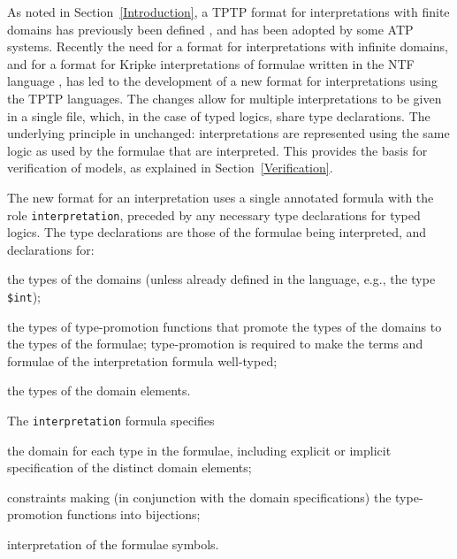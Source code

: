 \documentclass[letterpaper]{article}
\newcommand{\smalltt}[1]{\small \texttt{#1}}
\newenvironment{packed_itemize}{
\vspace*{-0.5em}
\begin{itemize}
\setlength{\partopsep}{0pt}
\setlength{\itemsep}{1pt}
\setlength{\parskip}{0pt}
\setlength{\parsep}{0pt}
}{\end{itemize}}
\begin{document}
As noted in Section~\ref{Introduction}, a TPTP format for interpretations with finite domains 
has previously been defined \cite{SS+06}, and has been adopted by some ATP systems.
Recently the need for a format for interpretations with infinite domains, and for a format for 
Kripke interpretations \cite{Kri63} of formulae written in the NTF language \cite{SF+22}, has 
led to the development of a new format for interpretations using the TPTP languages.
The changes allow for multiple interpretations to be given in a single file, which, in the case
of typed logics, share type declarations.
The underlying principle in unchanged: interpretations are represented using the same logic
as used by the formulae that are interpreted.
This provides the basis for verification of models, as explained in Section~\ref{Verification}.

The new format for an interpretation uses a single annotated formula with the role 
\smalltt{interpretation}, preceded by any necessary type declarations for typed logics.
The type declarations are those of the formulae being interpreted, and declarations for:
\begin{packed_itemize}
\item the types of the domains (unless already defined in the language, e.g., the type
      \smalltt{\$int});
\item the types of type-promotion functions that promote the types of the domains to the types 
      of the formulae; type-promotion is required to make the terms and formulae of the
      interpretation formula well-typed;
\item the types of the domain elements.
\end{packed_itemize}
\vspace*{-0.4em}
The \smalltt{interpretation} formula specifies 
\begin{packed_itemize}
\item the domain for each type in the formulae, including explicit or implicit specification
      of the distinct domain elements;
\item constraints making (in conjunction with the domain specifications) the type-promotion 
      functions into bijections;
\item interpretation of the formulae symbols.
\end{packed_itemize}
\end{document}
